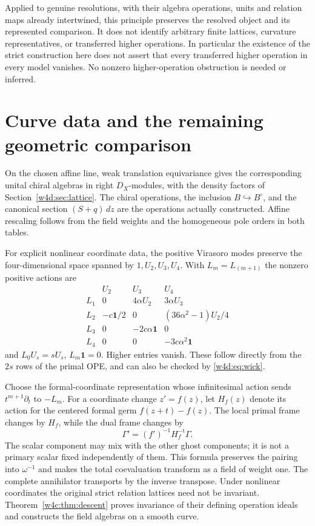 Applied to genuine resolutions, with their algebra operations, units and relation maps already intertwined, this principle preserves the resolved object and its represented comparison. It does not identify arbitrary finite lattices, curvature representatives, or transferred higher operations. In particular the existence of the strict construction here does not assert that every transferred higher operation in every model vanishes. No nonzero higher-operation obstruction is needed or inferred.

\section{Curve data and the remaining geometric comparison}\label{w4d:sec:curve}
On the chosen affine line, weak translation equivariance gives the corresponding unital chiral algebras in right $D_X$-modules, with the density factors of Section~\ref{w4d:sec:lattice}. The chiral operations, the inclusion $B\hookrightarrow B^\circ$, and the canonical section $(S+q)\,dz$ are the operations actually constructed. Affine rescaling follows from the field weights and the homogeneous pole orders in both tables.

For explicit nonlinear coordinate data, the positive Virasoro modes preserve the four-dimensional space spanned by $1,U_2,U_3,U_4$. With $L_m=L_{(m+1)}$ the nonzero positive actions are
\[
\begin{array}{c|ccc}
 &U_2&U_3&U_4\\\hline
L_1&0&4\alpha U_2&3\alpha U_3\\
L_2&-c\mathbf1/2&0&(36\alpha^2-1)U_2/4\\
L_3&0&-2c\alpha\mathbf1&0\\
L_4&0&0&-3c\alpha^2\mathbf1
\end{array}
\]
and $L_0U_s=sU_s$, $L_m\mathbf1=0$. Higher entries vanish. These follow directly from the $2s$ rows of the primal OPE, and can also be checked by \eqref{w4d:eq:wick}.

Choose the formal-coordinate representation whose infinitesimal action sends $t^{m+1}\partial_t$ to $-L_m$. For a coordinate change $z'=f(z)$, let $H_f(z)$ denote its action for the centered formal germ $f(z+t)-f(z)$. The local primal frame changes by $H_f$, while the dual frame changes by
\[
 \Gamma'=(f')^{-1}H_f^{-\mathrm t}\Gamma.
\]
The scalar component may mix with the other ghost components; it is not a primary scalar fixed independently of them. This formula preserves the pairing into $\omega^{-1}$ and makes the total coevaluation transform as a field of weight one. The complete annihilator transports by the inverse transpose.
Under nonlinear coordinates the original strict relation lattices
need not be invariant. Theorem~\ref{w4c:thm:descent} proves
invariance of their defining operation ideals and constructs the
field algebras on a smooth curve.

